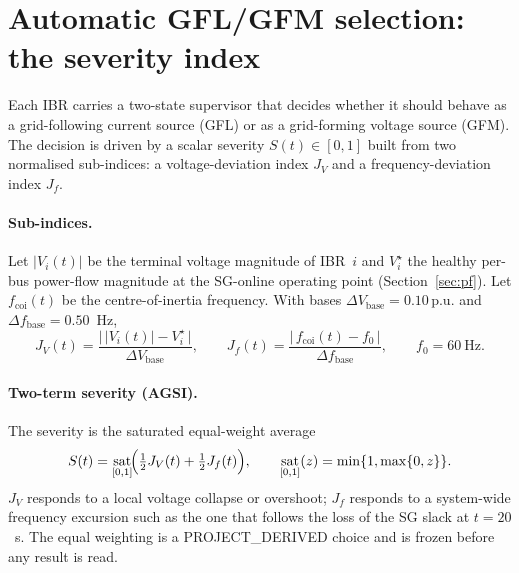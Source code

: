 \documentclass[12pt,a4paper]{article}
\DeclareMathOperator{\sat}{sat}
\newcommand{\pu}{\,\mathrm{p.u.}}
\begin{document}
\section{Automatic GFL/GFM selection: the severity index}\label{sec:sev}
Each IBR carries a two-state supervisor that decides whether it should behave as
a grid-following current source (GFL) or as a grid-forming voltage source (GFM).
The decision is driven by a scalar severity $S(t)\in[0,1]$ built from two
normalised sub-indices: a voltage-deviation index $J_V$ and a
frequency-deviation index $J_f$.

\paragraph{Sub-indices.}
Let $|V_i(t)|$ be the terminal voltage magnitude of IBR~$i$ and $V_i^{\star}$ the
healthy per-bus power-flow magnitude at the SG-online operating point
(Section~\ref{sec:pf}). Let $f_{\mathrm{coi}}(t)$ be the centre-of-inertia
frequency. With bases $\Delta V_{\mathrm{base}}=0.10\pu$ and
$\Delta f_{\mathrm{base}}=0.50$~Hz,
\begin{equation}
  J_V(t)=\frac{\bigl|\,|V_i(t)|-V_i^{\star}\,\bigr|}{\Delta V_{\mathrm{base}}},
  \qquad
  J_f(t)=\frac{\bigl|\,f_{\mathrm{coi}}(t)-f_0\,\bigr|}{\Delta f_{\mathrm{base}}},
  \qquad f_0=60~\mathrm{Hz}.
  \label{eq:jvjf}
\end{equation}

\paragraph{Two-term severity (AGSI).}
The severity is the saturated equal-weight average
\begin{equation}
  S(t)=\sat_{[0,1]}\!\Bigl(\tfrac12 J_V(t)+\tfrac12 J_f(t)\Bigr),
  \qquad
  \sat_{[0,1]}(z)=\min\{1,\max\{0,z\}\}.
  \label{eq:agsi}
\end{equation}
$J_V$ responds to a local voltage collapse or overshoot; $J_f$ responds to a
system-wide frequency excursion such as the one that follows the loss of the SG
slack at $t=20$~s. The equal weighting is a \textsf{PROJECT\_DERIVED} choice and
is frozen before any result is read.
\end{document}
